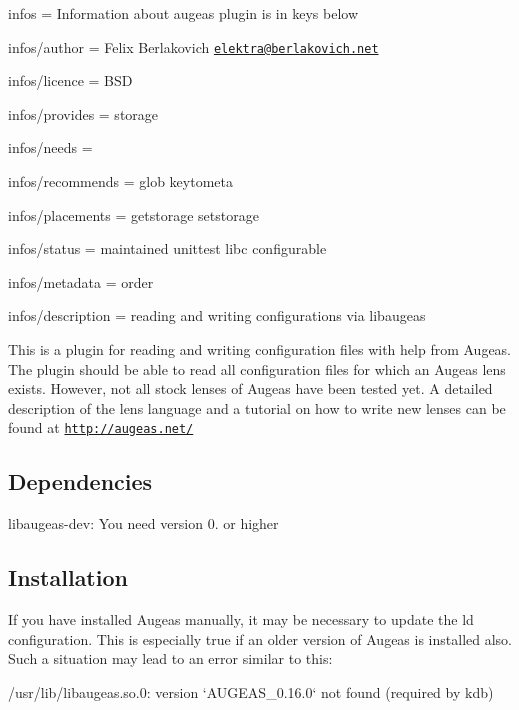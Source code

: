 
\begin{DoxyItemize}
\item infos = Information about augeas plugin is in keys below
\item infos/author = Felix Berlakovich \href{mailto:elektra@berlakovich.net}{\tt elektra@berlakovich.\+net}
\item infos/licence = B\+SD
\item infos/provides = storage
\item infos/needs =
\item infos/recommends = glob keytometa
\item infos/placements = getstorage setstorage
\item infos/status = maintained unittest libc configurable
\item infos/metadata = order
\item infos/description = reading and writing configurations via libaugeas
\end{DoxyItemize}

This is a plugin for reading and writing configuration files with help from Augeas. The plugin should be able to read all configuration files for which an Augeas lens exists. However, not all stock lenses of Augeas have been tested yet. A detailed description of the lens language and a tutorial on how to write new lenses can be found at \href{http://augeas.net/}{\tt http\+://augeas.\+net/}

\subsection*{Dependencies}


\begin{DoxyItemize}
\item {\ttfamily libaugeas-\/dev}\+: You need version 0. or higher
\end{DoxyItemize}

\subsection*{Installation}

If you have installed Augeas manually, it may be necessary to update the ld configuration. This is especially true if an older version of Augeas is installed also. Such a situation may lead to an error similar to this\+: \begin{DoxyVerb}/usr/lib/libaugeas.so.0: version `AUGEAS_0.16.0` not found (required by kdb)
\end{DoxyVerb}


